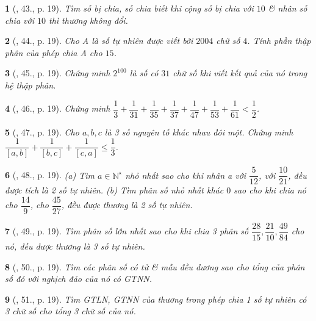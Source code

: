 \documentclass{article}
\newtheorem{baitoan}{}
\begin{document}
\begin{baitoan}[\cite{Binh_Toan_6_tap_2}, 43., p. 19]
	Tìm số bị chia, số chia biết khi cộng số bị chia với $10$ \& nhân số chia với $10$ thì thương không đổi.
\end{baitoan}

\begin{baitoan}[\cite{Binh_Toan_6_tap_2}, 44., p. 19]
	Cho A là số tự nhiên được viết bởi $2004$ chữ số $4$. Tính phần thập phân của phép chia A cho $15$.
\end{baitoan}

\begin{baitoan}[\cite{Binh_Toan_6_tap_2}, 45., p. 19]
	Chứng minh $2^{100}$ là số có $31$ chữ số khi viết kết quả của nó trong hệ thập phân.
\end{baitoan}

\begin{baitoan}[\cite{Binh_Toan_6_tap_2}, 46., p. 19]
	Chứng minh $\dfrac{1}{3} + \dfrac{1}{31} + \dfrac{1}{35} + \dfrac{1}{37} + \dfrac{1}{47} + \dfrac{1}{53} + \dfrac{1}{61} < \dfrac{1}{2}$.
\end{baitoan}

\begin{baitoan}[\cite{Binh_Toan_6_tap_2}, 47., p. 19]
	Cho $a,b,c$ là 3 số nguyên tố khác nhau đôi một. Chứng minh $\dfrac{1}{[a,b]} + \dfrac{1}{[b,c]} + \dfrac{1}{[c,a]}\le\dfrac{1}{3}$.
\end{baitoan}

\begin{baitoan}[\cite{Binh_Toan_6_tap_2}, 48., p. 19]
	(a) Tìm $a\in\mathbb{N}^\star$ nhỏ nhất sao cho khi nhân a với $\dfrac{5}{12}$, với $\dfrac{10}{21}$, đều được tích là 2 số tự nhiên. (b) Tìm phân số nhỏ nhất khác $0$ sao cho khi chia nó cho $\dfrac{14}{9}$, cho $\dfrac{45}{27}$, đều được thương là 2 số tự nhiên.
\end{baitoan}

\begin{baitoan}[\cite{Binh_Toan_6_tap_2}, 49., p. 19]
	Tìm phân số lớn nhất sao cho khi chia 3 phân số $\dfrac{28}{15},\dfrac{21}{10},\dfrac{49}{84}$ cho nó, đều được thương là 3 số tự nhiên.
\end{baitoan}

\begin{baitoan}[\cite{Binh_Toan_6_tap_2}, 50., p. 19]
	Tìm các phân số có tử \& mẫu đều dương sao cho tổng của phân số đó với nghịch đảo của nó có {\rm GTNN}.
\end{baitoan}

\begin{baitoan}[\cite{Binh_Toan_6_tap_2}, 51., p. 19]
	Tìm {\rm GTLN, GTNN} của thương trong phép chia 1 số tự nhiên có 3 chữ số cho tổng 3 chữ số của nó.
\end{baitoan}
\end{document}
